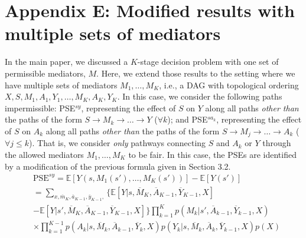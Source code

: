 \documentclass[letterpaper]{article} %
\newcommand{\E}{\mathbb{E}}
\begin{document}
\section*{Appendix E: Modified results with multiple sets of mediators}
In the main paper, we discussed a $K$-stage decision problem with one set of permissible mediators, $M$. Here, we extend those results to the setting where we have multiple sets of mediators $M_1, \ldots, M_K$, i.e., a DAG with topological ordering $X, S, M_1, A_1, Y_1, \ldots, M_K, A_K, Y_K$. In this case, we consider the following paths impermissible: PSE$^{sy}$, representing the effect of $S$ on $Y$ along all paths \emph{other than} the paths of the form $S \to M_k \to \ldots \to Y$ ($\forall k$); and PSE$^{sa_k}$, representing the effect of $S$ on $A_k$ along all paths \emph{other than} the paths of the form $S \to M_j \to \ldots \to A_k$ ($\forall j \leq k$). That is, we consider \emph{only} pathways connecting $S$ and $A_k$ or $Y$ through the allowed mediators $M_1, \ldots, M_K$ to be fair. In this case, the PSEs are identified by a modification of the previous formula given in Section 3.2. 
%
{\small
\begin{align*}
	&\text{PSE}^{sy} = \E[Y(s,M_1(s'),\ldots,M_K(s'))] - \E[Y(s')] \\ 
	&= \sum_{x,\overline{m}_K,\overline{a}_{K-1},\overline{y}_{K-1},} \{ \E[Y | s,\overline{M}_K, \overline{A}_{K-1},\overline{Y}_{K-1},X]\\
	&- \E[Y | s', \overline{M}_K, \overline{A}_{K-1},\overline{Y}_{K-1},X] \} \prod_{k=1}^K p(M_k | s',\overline{A}_{k-1},\overline{Y}_{k-1},X)\\
	&\times \prod_{k=1}^{K-1} p(A_k | s, \overline{M}_k,\overline{A}_{k-1},\overline{Y}_{k},X) p(Y_k | s,\overline{M}_k,\overline{A}_{k},\overline{Y}_{k-1},X) p(X) 
	\\
	&\mbox{}
\end{align*}
}
\end{document}
